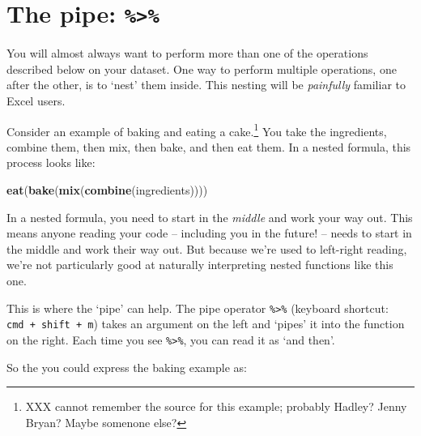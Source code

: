 \documentclass[]{book}
\newenvironment{Shaded}{\begin{snugshade}}{\end{snugshade}}
\newcommand{\CommentTok}[1]{\textcolor[rgb]{0.56,0.35,0.01}{\textit{#1}}}
\newcommand{\KeywordTok}[1]{\textcolor[rgb]{0.13,0.29,0.53}{\textbf{#1}}}
\newcommand{\NormalTok}[1]{#1}
\newcommand{\OperatorTok}[1]{\textcolor[rgb]{0.81,0.36,0.00}{\textbf{#1}}}
\newcommand{\StringTok}[1]{\textcolor[rgb]{0.31,0.60,0.02}{#1}}
\begin{document}
\hypertarget{the-pipe}{%
\section{\texorpdfstring{The pipe: \texttt{\%\textgreater{}\%}}{The pipe: \%\textgreater{}\%}}\label{the-pipe}}

You will almost always want to perform more than one of the operations described below on your dataset. One way to perform multiple operations, one after the other, is to `nest' them inside. This nesting will be \emph{painfully} familiar to Excel users.

Consider an example of baking and eating a cake.\footnote{XXX cannot remember the source for this example; probably Hadley? Jenny Bryan? Maybe somenone else?} You take the ingredients, combine them, then mix, then bake, and then eat them. In a nested formula, this process looks like:

\begin{Shaded}
\begin{Highlighting}[]
\KeywordTok{eat}\NormalTok{(}\KeywordTok{bake}\NormalTok{(}\KeywordTok{mix}\NormalTok{(}\KeywordTok{combine}\NormalTok{(ingredients))))}
\end{Highlighting}
\end{Shaded}

In a nested formula, you need to start in the \emph{middle} and work your way out. This means anyone reading your code -- including you in the future! -- needs to start in the middle and work their way out. But because we're used to left-right reading, we're not particularly good at naturally interpreting nested functions like this one.

This is where the `pipe' can help. The pipe operator \texttt{\%\textgreater{}\%} (keyboard shortcut: \texttt{cmd\ +\ shift\ +\ m}) takes an argument on the left and `pipes' it into the function on the right. Each time you see \texttt{\%\textgreater{}\%}, you can read it as `and then'.

So the you could express the baking example as:

\begin{Shaded}
\end{Shaded}
\end{document}
